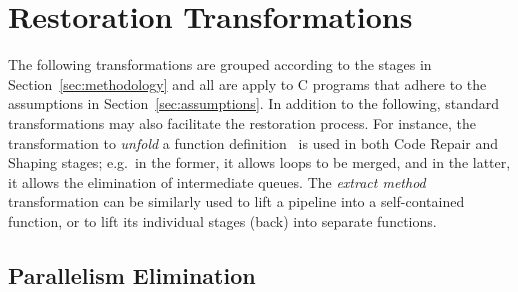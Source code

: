 \section{Restoration Transformations} \label{sec:refactoring}

%
The following transformations are grouped according to the stages in Section~\ref{sec:methodology} and all are apply to C programs that adhere to the assumptions in Section~\ref{sec:assumptions}.
%
In addition to the following, standard transformations may also facilitate the restoration process. For instance, the transformation to \emph{unfold} a function definition~\cite{darlington77} is used in both Code Repair and Shaping stages; e.g.\ in the former, it allows loops to be merged, and in the latter, it allows the elimination of intermediate queues. The \emph{extract method}~\cite{DBLP:books/daglib/0019908} transformation can be similarly used to lift a pipeline into a self-contained function, or to lift its individual stages (back) into separate functions.


\subsection{Parallelism Elimination}
\label{sec:refac:elimination}


